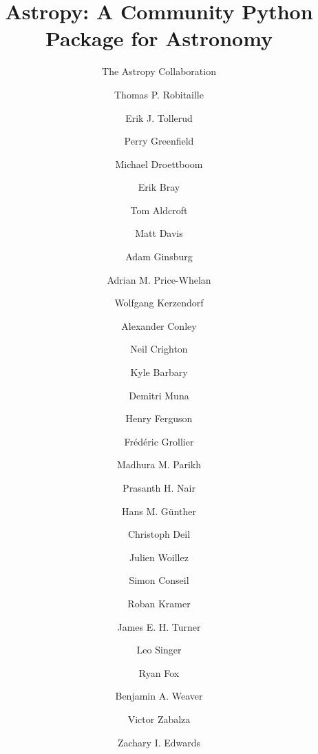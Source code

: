 \documentclass[traditabstract]{aa}
\begin{document}



\title{Astropy: A Community Python Package for Astronomy}




\author{
The Astropy Collaboration
  \and
Thomas P. Robitaille\inst{\ref{inst:mpia}}  %
  \and
Erik J. Tollerud\inst{\ref{inst:yale}, \ref{inst:hubble}}  %
  \and
Perry Greenfield\inst{\ref{inst:stsci}}  %
  \and
Michael Droettboom\inst{\ref{inst:stsci}}  %
  \and
Erik Bray\inst{\ref{inst:stsci}}  %
  \and
Tom Aldcroft\inst{\ref{inst:cfa}}  %
  \and
Matt Davis\inst{\ref{inst:stsci}}  %
  \and
Adam Ginsburg\inst{\ref{inst:colorado}}  %
  \and
Adrian M. Price-Whelan\inst{\ref{inst:columbia}}  %
  \and
Wolfgang Kerzendorf\inst{\ref{inst:toronto}}  %
  \and
Alexander Conley\inst{\ref{inst:colorado}}  %
  \and
Neil Crighton\inst{\ref{inst:mpia}}  %
  \and
Kyle Barbary\inst{\ref{inst:argonne}}  %
  \and
Demitri Muna\inst{\ref{inst:osu}}  %
  \and
Henry Ferguson\inst{\ref{inst:stsci}}  %
  \and
Fr\'ed\'eric Grollier\inst{\ref{inst:freelance}}  %
  \and
Madhura M. Parikh\inst{\ref{inst:surat}}  %
  \and
Prasanth H. Nair\inst{\ref{inst:freelance}}  %
  \and
Hans M. G\"unther\inst{\ref{inst:cfa}}  %
  \and
Christoph Deil\inst{\ref{inst:mpik}}  %
  \and
Julien Woillez\inst{\ref{inst:eso_garching}}  %
  \and
Simon Conseil\inst{\ref{inst:oamp}}  %
  \and
Roban Kramer\inst{\ref{inst:eth}}  %
  \and
James E. H. Turner\inst{\ref{inst:gemini_s}}  %
  \and
Leo Singer\inst{\ref{inst:ligo}}  %
  \and
Ryan Fox\inst{\ref{inst:freelance}}  %
  \and
Benjamin A. Weaver\inst{\ref{inst:nyu}}  %
  \and
Victor Zabalza\inst{\ref{inst:mpik}}  %
  \and
Zachary I. Edwards\inst{\ref{inst:louisiana}}  %
  \and
}
\end{document}
